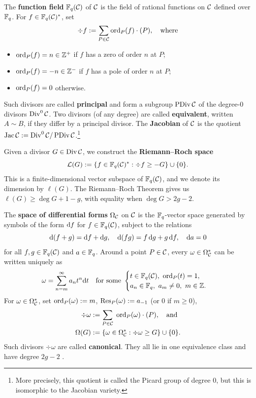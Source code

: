 \documentclass[twocolumn, 11pt]{scrartcl}
\begin{document}
The \textbf{function field} $\bbF_q(\mcC)$ of $\mcC$ is the field of rational functions on $\mcC$ defined over $\bbF_q$. For $f\in\bbF_q(\mcC)^*$, set
\[ \div f:=\sum_{P\in\mcC} \ord_P(f)\cdot(P),\quad\text{where} \]
\begin{itemize}
    \item $\ord_P(f)=n\in\bbZ^+$ if $f$ has a zero of order $n$ at $P$;
    \item $\ord_P(f)=-n\in\bbZ^-$ if $f$ has a pole of order $n$ at $P$;
    \item $\ord_P(f)=0$ otherwise.
\end{itemize}
Such divisors are called \textbf{principal} and form a subgroup $\PDiv\mcC$ of the degree-0 divisors $\Div^0\mcC$. Two divisors (of any degree) are called \textbf{equivalent}, written $A\sim B$, if they differ by a principal divisor. The \textbf{Jacobian} of $\mcC$ is the quotient $\Jac\mcC:=\Div^0\mcC/\PDiv\mcC$.\footnote{More precisely, this quotient is called the Picard group of degree 0, but this is isomorphic to the Jacobian variety.}

Given a divisor $G\in\Div\mcC$, we construct the \textbf{Riemann--Roch space}
\[ \mcL(G):=\set{f\in\bbF_q(\mcC)^*:\div f\geq-G}\cup\set0. \]
This is a finite-dimensional vector subspace of $\bbF_q(\mcC)$, and we denote its dimension by $\ell(G)$. The Riemann--Roch Theorem \cite[\S1.5]{stichtenoth2009algebraic} gives us $\ell(G)\geq\deg G+1-g$, with equality when $\deg G>2g-2$.

The \textbf{space of differential forms} $\Omega_\mcC$ on $\mcC$ is the $\bbF_q$-vector space generated by symbols of the form $\df$ for $f\in\bbF_q(\mcC)$, subject to the relations
\[ \dx[(f+g)]=\df+\dg,\quad \dx[(fg)]=f\,\dg+g\,\df,\quad \da=0 \]
for all $f,g\in\bbF_q(\mcC)$ and $a\in\bbF_q$. Around a point $P\in\mcC$, every $\omega\in\Omega_\mcC^*$ can be written uniquely as
\[ \omega=\sum_{n=m}^\infty a_nt^n\dt\quad\text{for some  } \begin{cases}
        t\in\bbF_q(\mcC),\ \ord_P(t)=1, \\
        a_n\in\bbF_q,\ a_m\neq 0,\ m\in\bbZ.
    \end{cases} \]
For $\omega\in\Omega_\mcC^*$, set $\ord_P(\omega):=m$, $\Res_P(\omega):=a_{-1}$ (or 0 if $m\geq 0$),
\vspace{-6pt}
\begin{align*}
    \div\omega&:=\sum_{P\in\mcC}\;\ord_P(\omega)\cdot(P),\quad\text{and}\\
    \Omega(G)&:=\set{\omega\in\Omega_\mcC^*:\div\omega\geq G}\cup\set0.
\end{align*}
Such divisors $\div\omega$ are called \textbf{canonical}. They all lie in one equivalence class and have degree $2g-2$ \cite[\S1.5]{stichtenoth2009algebraic}.
\end{document}
